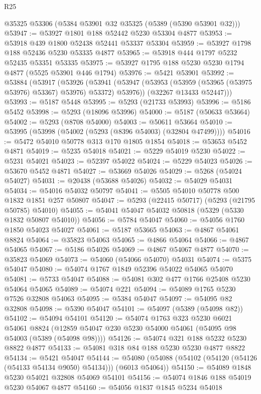 \begin{lexlean}{R25}
\begin{coremodule}
    @35325
    @53306
    (@5384 @53901 @32 @35325 (@5389 (@5390 @53901 @32)))
@53947 := @53927 @1801 @188 @52442 @5230 @53304 @4877
@53953 := @53918 @439 @1800 @52438 @52441 @53337 @53304
@53959 := @53927 @1798 @188 @52436 @5230 @53335 @4877
@53965 := @53918 @444 @1797 @5232 @52435 @53351 @53335
@53975 := @53927 @1795 @188 @5230 @5230 @1794 @4877 (@5525 @53901 @446 @1794)
@53976 := @5421 @53901
@53992 := @53884
    (@53917
      (@53926
        (@53941 (@53947 (@53953 (@53959 (@53965 (@53975 @53976) @53367) @53976) @53372) @53976))
        (@32267 @13433 @52447)))
@53993 := @5187 @5448
@53995 := @5293 (@21733 @53993)
@53996 := @5186 @5452
@53998 := @5293 (@18096 @53996)
@54000 := @5187 (@50633 @53664)
@54002 := @5293 (@8708 @54000)
@54003 := @50611 @53664
@54010 := @53995 (@53998 (@54002 (@5293 (@8396 @54003) (@32804 @47499))))
@54016 := @5472 @54010 @50778 @313 @170 @1805 @1854
@54018 := @53653 @5452 @4871
@54019 := @5235 @54018
@54021 := @5229 @54019 @5230
@54022 := @5231 @54021
@54023 := @52397 @54022
@54024 := @5229 @54023
@54026 := @53670 @5452 @4871
@54027 := @53669 @54026
@54029 := @5268 (@54024 @54027)
@54031 := @20438 (@53688 @54026)
@54032 := @54029 @54031
@54034 := @54016 @54032 @50797
@54041 := @5505 @54010 @50778 @500 @1832 @1851 @257 @50807
@54047 := @5293 (@22415 @50717) (@5293 (@21795 @50785) @54010)
@54055 := @54041 @54047 @54032 @50818 (@5329 (@5330 @1832 @50807 @54010))
@54056 := @5784 @54047
@54060 := @54056 @1760 @1850 @54023 @54027
@54061 := @5187 @53665
@54063 := @4867 @54061 @8824
@54064 := @35823 @54063
@54065 := @4866 @54064
@54066 := @4867 @54065
@54067 := @5186 @54026
@54069 := @4867 @54067 @4877
@54070 := @35823 @54069
@54073 := @54060 (@54066 @54070) @54031
@54074 := @5375 @54047
@54080 := @54074 @1767 @1849 @52396 @54022 @54065 @54070
@54081 := @5733 @54047
@54088 := @54081 @302 @477 @1766 @25408 @5230 @54064 @54065
@54089 := @54074 @221
@54094 := @54089 @1765 @5230 @7526 @32808 @54063
@54095 := @5384 @54047
@54097 := @54095 @82 @32808
@54098 := @5390 @54047
@54101 := @54097 (@5389 (@54098 @82))
@54102 := @54094 @54101
@54120 := @54074
    @1763
    @323
    @5230
    @6021
    @54061
    @8824
    (@12859 @54047 @230 @5230 @54000 @54061 (@54095 @98 @54003 (@5389 (@54098 @98))))
@54126 := @54074 @321 @188 @5232 @5230 @8822 @4877
@54133 := @54081 @318 @84 @188 @5230 @5230 @4877 @8822
@54134 := @5421 @54047
@54144 := @54080 (@54088 (@54102 (@54120 (@54126 (@54133 @54134 @9050) @54134))) (@6013 @54064))
@54150 := @54089 @1848 @5230 @54021 @32808 @54069 @54101
@54156 := @54074 @1846 @188 @54019 @5230 @54067 @4877
@54160 := @54056 @1837 @1845 @5234 @54018

\end{coremodule}
\end{lexlean}
